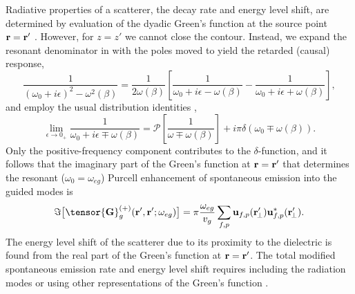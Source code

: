 \documentclass[preprint,aps,pra,onecolumn]{revtex4-1} %
\begin{document}
Radiative properties of a scatterer, the decay rate and energy level shift, are determined by evaluation of the dyadic Green's function at the source point $\mathbf{r} = \mathbf{r}'$ \cite{fussell_decay_2005}.  However, for $z=z'$ we cannot close the contour. Instead, we expand the resonant denominator in  with the poles moved to yield the retarded (causal) response,
\begin{equation}
\frac{1}{(\omega_0+i\epsilon)^2-\omega^2(\beta)}=\frac{1}{2 \omega(\beta)}\left[ \frac{1}{\omega_0+ i 
\epsilon - \omega(\beta)} - \frac{1}{\omega_0+ i \epsilon + \omega(\beta)} \right],
\end{equation}
 and employ the usual distribution identities \cite{sondergaard_general_2001},
\begin{equation}
\lim_{\epsilon \rightarrow 0_+} \frac{1}{\omega_0 + i \epsilon \mp 
\omega(\beta)}=\mathcal{P}\left[\frac{1}{\omega \mp \omega(\beta)} \right] + i \pi \delta (\omega_0 \mp 
\omega(\beta)).
\end{equation}
Only the positive-frequency component contributes to the $\delta$-function, and it follows that the imaginary part of the Green's function at $\mathbf{r} = \mathbf{r}'$ that determines the resonant ($\omega_0 = \omega_{eg}$) Purcell enhancement of spontaneous emission into the guided modes is \cite{dung_spontaneous_2000, fussell_decay_2005, chen_finite-element_2010}
	\begin{equation}\label{Eq::ImGreenLocal}
		\Im \big[\tensor{\mathbf{G}}^{(+)}_g(\br',\br'; \omega_{eg}) \big] = \pi \frac{\omega_{eg}}{v_g } \sum_{f, p} 
		\mathbf{u}_{f, p} (\br_{\!\perp}^\prime)\mathbf{u}^*_{f , p} (\br_{\!\perp}^\prime).
	\end{equation}
The energy level shift of the scatterer due to its proximity to the dielectric is found from the real part of the Green's function at $\mathbf{r} = \mathbf{r}'$. The total modified spontaneous emission rate and energy level shift requires including the radiation modes \cite{le_kien_spontaneous_2005} or using other representations of the Green's function \cite{klimov_spontaneous_2004}.  
\end{document}
